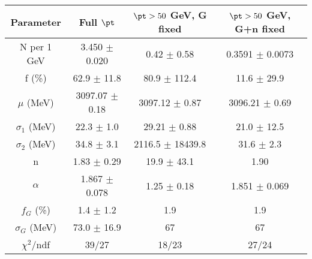 \begin{tabular}{c||c|c|c}
Parameter & Full $\pt$ & $\pt>50$ GeV, G fixed & $\pt>50$ GeV, G+n fixed \\
\hline
N per 1 GeV & 3.450 $\pm$ 0.020 & 0.42 $\pm$ 0.58 & 0.3591 $\pm$ 0.0073\\
f (\%) & 62.9 $\pm$ 11.8 & 80.9 $\pm$ 112.4 & 11.6 $\pm$ 29.9\\
$\mu$ (MeV) & 3097.07 $\pm$ 0.18 & 3097.12 $\pm$ 0.87 & 3096.21 $\pm$ 0.69\\
$\sigma_1$ (MeV) & 22.3 $\pm$ 1.0 & 29.21 $\pm$ 0.88 & 21.0 $\pm$ 12.5\\
$\sigma_2$ (MeV) & 34.8 $\pm$ 3.1 & 2116.5 $\pm$ 18439.8 & 31.6 $\pm$ 2.3\\
n & 1.83 $\pm$ 0.29 & 19.9 $\pm$ 43.1 & 1.90\\
$\alpha$ & 1.867 $\pm$ 0.078 & 1.25 $\pm$ 0.18 & 1.851 $\pm$ 0.069\\
$f_G$ (\%) & 1.4 $\pm$ 1.2 & 1.9 & 1.9\\
$\sigma_G$ (MeV) & 73.0 $\pm$ 16.9 & 67 & 67\\
\hline
$\chi^2$/ndf & 39/27 & 18/23 & 27/24\\
\end{tabular}
